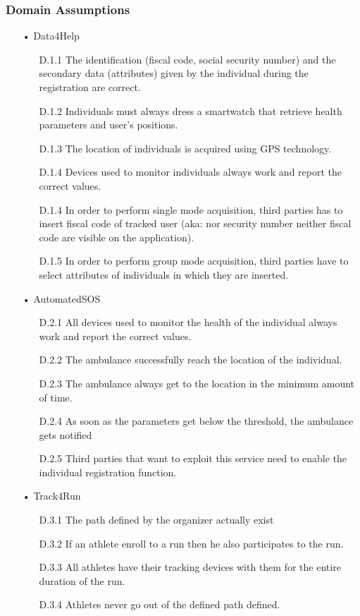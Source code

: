 \subsubsection{Domain Assumptions}
\begin{enumerate}

\item[•] {\Large Data4Help}
	\begin{enumerate}
	\item [D.1.1] The identification (fiscal code, social security number) and the secondary data (attributes) given by the individual during the registration are correct.
    \item [D.1.2] Individuals must always dress a smartwatch that retrieve health parameters and user's positions.
    
    \item [D.1.3] The location of individuals is acquired using GPS technology.
    \item [D.1.4] Devices used to monitor individuals always work and report the correct values.
	\item [D.1.4] In order to perform single mode acquisition, third parties has to insert fiscal code of tracked user (aka: nor security number neither fiscal code are visible on the application).
	\item [D.1.5] In order to perform group mode acquisition, third parties have to select attributes of individuals in which they are inserted.
	\end{enumerate}
	
\item[•] {\Large AutomatedSOS}
	\begin{enumerate}
	\item [D.2.1] All devices used to monitor the health of the individual always work and report the correct values.
    \item [D.2.2] The ambulance successfully reach the location of the individual.
    \item [D.2.3] The ambulance always get to the location in the minimum amount of time.
    \item [D.2.4] As soon as the parameters get below the threshold, the ambulance gets notified
    \item [D.2.5] Third parties that want to exploit this service need to enable the individual registration function.
	\end{enumerate}
	
\item[•] {\Large Track4Run}
	\begin{enumerate}
	\item [D.3.1] The path defined by the organizer actually exist
    \item [D.3.2] If an athlete enroll to a run then he also participates to the run.
    \item [D.3.3] All athletes have their tracking devices with them for the entire duration of the run.
    \item [D.3.4] Athletes never go out of the defined path defined.
	\end{enumerate}
	
\end{enumerate}